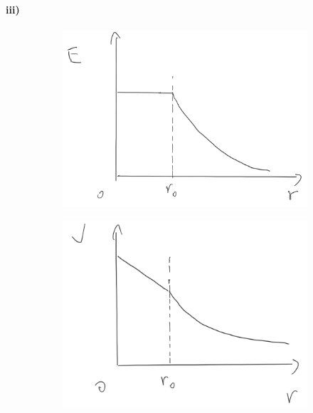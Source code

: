 \documentclass[../homework.tex]{subfiles}
\begin{document}
\paragraph{iii)}
\begin{subp}
	\begin{figure}[H]
		\centering
		\begin{subfigure}{.4\textwidth}
			\centering
			\includegraphics[width=\linewidth]{p2-a-sketch-E.png}
		\end{subfigure}%
		\begin{subfigure}{.4\textwidth}
			\centering
			\includegraphics[width=\linewidth]{p2-a-sketch-V.png}
		\end{subfigure}
	\end{figure}
\end{subp}
\end{document}
